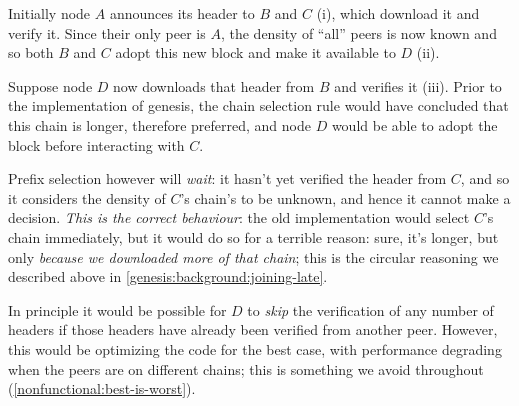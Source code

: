 Initially node $A$ announces its header to $B$ and $C$ (i), which download it
and verify it. Since their only peer is $A$, the density of ``all'' peers is now
known and so both $B$ and $C$ adopt this new block and make it available to $D$
(ii).

Suppose node $D$ now downloads that header from $B$ and verifies it (iii).
Prior to the implementation of genesis, the chain selection rule would have
concluded that this chain is longer, therefore preferred, and node $D$ would be
able to adopt the block before interacting with $C$.

Prefix selection however will \emph{wait}: it hasn't yet verified the header
from $C$, and so it considers the density of $C$'s chain's to be unknown, and
hence it cannot make a decision. \emph{This is the correct behaviour}: the
old implementation would select $C$'s chain immediately, but it would do so
for a terrible reason: sure, it's longer, but only \emph{because we downloaded
more of that chain}; this is the circular reasoning we described above in
\cref{genesis:background:joining-late}.

In principle it would be possible for $D$ to \emph{skip} the verification of
any number of headers if those headers have already been verified from another
peer. However, this would be optimizing the code for the best case, with
performance degrading when the peers are on different chains; this is something
we avoid throughout (\cref{nonfunctional:best-is-worst}).








